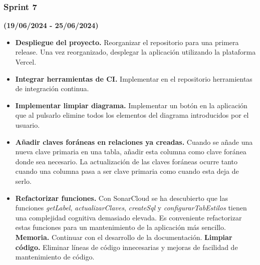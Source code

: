 \subsubsection{Sprint 7}
\textbf{(19/06/2024 - 25/06/2024)}
\begin{itemize}
    \item \textbf{Despliegue del proyecto.} Reorganizar el repositorio para una primera release. Una vez reorganizado, desplegar la aplicación utilizando la plataforma Vercel.
    \item \textbf{Integrar herramientas de CI.} Implementar en el repositorio herramientas de integración continua.
    \item \textbf{Implementar limpiar diagrama.} Implementar un botón en la aplicación que al pulsarlo elimine todos los elementos del diagrama introducidos por el usuario.
    \item \textbf{Añadir claves foráneas en relaciones ya creadas.} Cuando se añade una nueva clave primaria en una tabla, añadir esta columna como clave foránea donde sea necesario. La actualización de las claves foráneas ocurre tanto cuando una columna pasa a ser clave primaria como cuando esta deja de serlo.
    \item \textbf{Refactorizar funciones.} Con SonarCloud se ha descubierto que las funciones \textit{getLabel}, \textit{actualizarClaves}, \textit{createSql} y \textit{configurarTabEstilos} tienen una complejidad cognitiva demasiado elevada. Es conveniente refactorizar estas funciones para un mantenimiento de la aplicación más sencillo.
    \textbf{Memoria.} Continuar con el desarrollo de la documentación.
    \textbf{Limpiar código.} Eliminar líneas de código innecesarias y mejoras de facilidad de mantenimiento de código.
\end{itemize}

